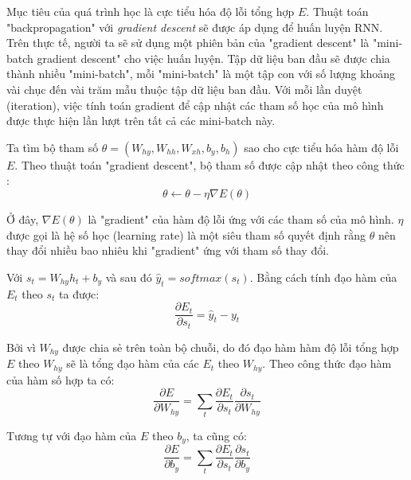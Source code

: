 Mục tiêu của quá trình học là cực tiểu hóa độ lỗi tổng hợp $E$. Thuật toán "backpropagation" với \textit{gradient descent} sẽ được áp dụng để huấn luyện RNN. Trên thực tế, người ta sẽ sử dụng một phiên bản của "gradient descent" là "mini-batch gradient descent" cho việc huấn luyện. Tập dữ liệu ban đầu sẽ được chia thành nhiều "mini-batch", mỗi "mini-batch" là một tập con với số lượng khoảng vài chục đến vài trăm mẫu thuộc tập dữ liệu ban đầu. Với mỗi lần duyệt (iteration), việc tính toán gradient để cập nhật các tham số học của mô hình được thực hiện lần lượt trên tất cả các mini-batch này.

Ta tìm bộ tham số $\theta = \left(W_{hy},W_{hh},W_{xh},b_y,b_h \right)$ sao cho cực tiểu hóa hàm độ lỗi $E$. Theo thuật toán "gradient descent", bộ tham số được cập nhật theo công thức :
\begin{equation} \label{gradientDescentWithTheta}
	\theta \leftarrow \theta - \eta \nabla E(\theta) 
\end{equation}

Ở đây, $\nabla E(\theta)$ là "gradient" của hàm độ lỗi ứng với các tham số của mô hình. $\eta$ được gọi là hệ số học (learning rate) là một siêu tham số quyết định rằng $\theta$ nên thay đổi nhiều bao nhiêu khi "gradient" ứng với tham số thay đổi.

Với $s_t = W_{hy} h_t + b_y$ và sau đó $\hat{y}_t = softmax(s_t)$. Bằng cách tính đạo hàm của $E_t$ theo $s_t$ ta được:
\begin{equation} \label{gradientWRTSt}
	\frac{\partial{E_t}}{\partial{s_t}} = \hat{y}_t - y_t
\end{equation}

Bởi vì $W_{hy}$ được chia sẻ trên toàn bộ chuỗi, do đó đạo hàm hàm độ lỗi tổng hợp $E$ theo $W_{hy}$ sẽ là tổng đạo hàm của các $E_t$ theo $W_{hy}$. Theo công thức đạo hàm của hàm số hợp ta có:
\begin{equation} \label{gradientWRTSt}
	\frac{\partial{E}}{\partial{W_{hy}}} = \sum_{t} \frac{\partial{E_t}}{\partial{s_t}} \frac{\partial{s_t}}{\partial{W_{hy}}}
\end{equation}

Tương tự với đạo hàm của $E$ theo $b_y$, ta cũng có:
\begin{equation} \label{gradientWRTSt}
	\frac{\partial{E}}{\partial{b_{y}}} = \sum_{t} \frac{\partial{E_t}}{\partial{s_t}} \frac{\partial{s_t}}{\partial{b_{y}}}
\end{equation}


